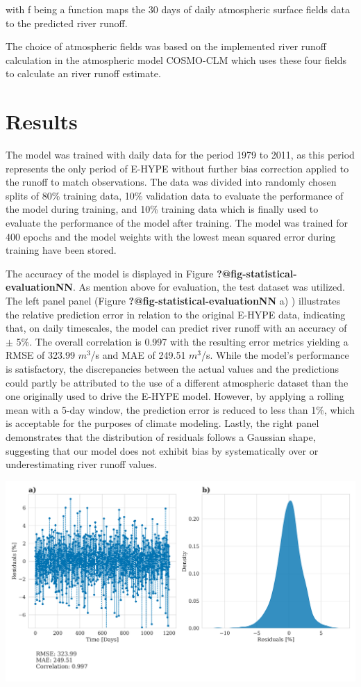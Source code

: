 \documentclass[
]{agujournal2019}
\begin{document}
with f being a function maps the 30 days of daily atmospheric surface
fields data to the predicted river runoff.

The choice of atmospheric fields was based on the implemented river
runoff calculation in the atmospheric model COSMO-CLM which uses these
four fields to calculate an river runoff estimate.

\section{Results}\label{results}

The model was trained with daily data for the period 1979 to 2011, as
this period represents the only period of E-HYPE without further bias
correction applied to the runoff to match observations. The data was
divided into randomly chosen splits of 80\% training data, 10\%
validation data to evaluate the performance of the model during
training, and 10\% training data which is finally used to evaluate the
performance of the model after training. The model was trained for 400
epochs and the model weights with the lowest mean squared error during
training have been stored.

The accuracy of the model is displayed in Figure
\textbf{?@fig-statistical-evaluationNN}. As mention above for
evaluation, the test dataset was utilized. The left panel panel (Figure
\textbf{?@fig-statistical-evaluationNN} a) ) illustrates the relative
prediction error in relation to the original E-HYPE data, indicating
that, on daily timescales, the model can predict river runoff with an
accuracy of \(\pm\) 5\%. The overall correlation is 0.997 with the
resulting error metrics yielding a RMSE of 323.99 \(m^3\)/s and MAE of
249.51 \(m^3\)/s. While the model's performance is satisfactory, the
discrepancies between the actual values and the predictions could partly
be attributed to the use of a different atmospheric dataset than the one
originally used to drive the E-HYPE model. However, by applying a
rolling mean with a 5-day window, the prediction error is reduced to
less than 1\%, which is acceptable for the purposes of climate modeling.
Lastly, the right panel demonstrates that the distribution of residuals
follows a Gaussian shape, suggesting that our model does not exhibit
bias by systematically over or underestimating river runoff values.

\includegraphics{../src/figures/paper_error_metrics.png}
\end{document}
